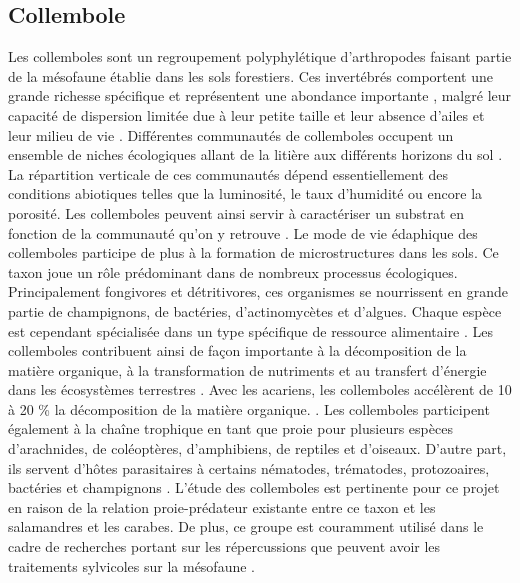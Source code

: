 \subsection*{Collembole}

Les collemboles sont un regroupement polyphylétique d'arthropodes faisant partie de la mésofaune établie dans les sols forestiers.
Ces invertébrés comportent une grande richesse spécifique et représentent une abondance importante \citep{rusekBiodiversityCollembolaTheir1998}, 
malgré leur capacité de dispersion limitée due à leur petite taille et leur absence d’ailes et leur milieu de vie \citep{Ojala2001Dispersalmicroarthropods}.
Différentes communautés de collemboles occupent un ensemble de niches écologiques allant de la litière aux différents horizons du sol \citep{pongeVerticalDistributionCollembola2000}.
La répartition verticale de ces communautés dépend essentiellement des conditions abiotiques telles que la luminosité, le taux d’humidité ou encore la porosité.
Les collemboles peuvent ainsi servir à caractériser un substrat en fonction de la communauté qu’on y retrouve \citep{rusekBiodiversityCollembolaTheir1998}.
Le mode de vie édaphique des collemboles participe de plus à la formation de microstructures dans les sols.
Ce taxon joue un rôle prédominant dans de nombreux processus écologiques. 
Principalement fongivores et détritivores, ces organismes se nourrissent en grande partie de champignons, de bactéries, d'actinomycètes et d'algues. 
Chaque espèce est cependant spécialisée dans un type spécifique de ressource alimentaire \citep{Chen1995Foodpreference,rusekBiodiversityCollembolaTheir1998}.
Les collemboles contribuent ainsi de façon importante à la décomposition de la matière organique, à la transformation de nutriments et 
au transfert d’énergie dans les écosystèmes terrestres \citep{Cuchta2019importantrole,Hattenschwiler2005Biodiversitylitter,Marsden2020Howagroforestry,Petersen2000Collembolapopulations,rusekBiodiversityCollembolaTheir1998,Wolters1991SoilInvertebrates}.
Avec les acariens, les collemboles accélèrent de 10 à 20 \% la décomposition de la matière organique. \citep{Hattenschwiler2005Biodiversitylitter}.
Les collemboles participent également à la chaîne trophique en tant que proie pour plusieurs espèces d’arachnides, de coléoptères, d’amphibiens, 
de reptiles et d’oiseaux. 
D'autre part, ils servent d’hôtes parasitaires à certains nématodes, trématodes, protozoaires, bactéries et champignons \citep{rusekBiodiversityCollembolaTheir1998}.
L'étude des collemboles est pertinente pour ce projet en raison de la relation proie-prédateur existante entre ce taxon et les salamandres et les carabes. 
De plus, ce groupe est couramment utilisé dans le cadre de recherches portant sur les répercussions que peuvent avoir les traitements sylvicoles sur la mésofaune \citep{farskaManagementIntensityAffects2014,rousseauWoodyBiomassRemoval2019,Salmon2008Relationshipssoil}.

